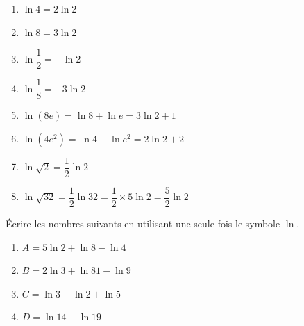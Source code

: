 \documentclass[a4paper,11pt,exos]{nsi} %
\begin{document}
\textcolor{UGLiBlue}{
    \begin{multicols}{2}
        \begin{enumerate}
            \item $\ln 4=2\ln 2$
            \item $\ln 8=3\ln 2$
            \item $\ln \dfrac{1}{2}=-\ln 2$
            \item $\ln \dfrac{1}{8}=-3\ln 2$
            \item $\ln (8e)=\ln 8+\ln e=3\ln 2+1$
            \item $\ln \left(4e^2\right)=\ln 4+\ln e^2=2\ln 2+2$
            \item $\ln \sqrt{2}=\dfrac{1}{2}\ln 2$
            \item $\ln \sqrt{32}=\dfrac{1}{2}\ln 32=\dfrac{1}{2}\times 5\ln 2=\dfrac{5}{2}\ln 2$
        \end{enumerate}
    \end{multicols}
}

\exo{}
Écrire les nombres suivants en utilisant une seule fois le symbole $\ln$.
\begin{multicols}{2}
    \begin{enumerate}
        \item $A= 5\ln 2+\ln 8-\ln 4$
        \item $B=2\ln 3+\ln 81-\ln 9$
        \item $C=\ln 3-\ln 2+\ln 5$
        \item $D=\ln 14-\ln 19$
    \end{enumerate}
\end{multicols}
\end{document}

